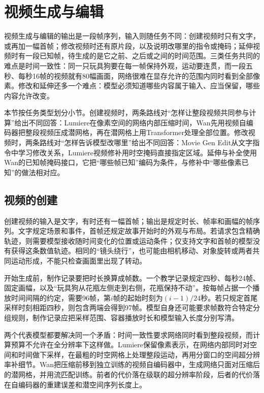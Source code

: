 \section{视频生成与编辑}
\label{sec:vision-multigen-video}

视频生成与编辑的输出是一段帧序列，输入则随任务不同：创建视频时只有文字，或再加一幅首帧；修改视频时还有原片段，以及说明改哪里的指令或掩码；延伸视频时有一段已知帧，待生成的是它之前、之后或之间的时间范围。三类任务共同的难点是时间一致性：同一只玩具狗要在每一帧保持外观，运动要连贯，而一段五秒、每秒16帧的视频就有80幅画面，网络很难在显存允许的范围内同时看到全部像素。修改和延伸还多一个难点：模型必须知道哪些内容属于输入、应当保留，哪些内容允许改变。

本节按任务类型划分小节。创建视频时，两条路线对“怎样让整段视频共同参与计算”给出不同回答：Lumiere在像素空间的网络内部压缩时间，Wan先用视频自编码器把整段视频压成潜网格，再在潜网格上用Transformer处理全部位置。修改视频时，两条路线对“怎样告诉模型改哪里”给出不同回答：Movie Gen Edit从文字指令中学习修改关系，Lumiere视频修补用时空掩码直接指定区域。延伸与补全使用Wan的已知帧掩码接口，它把“哪些帧已知”编码为条件，与修补中“哪些像素已知”的做法相对应。

\subsection{视频的创建}
\label{sec:vision-multigen-create-video}

创建视频的输入是文字，有时还有一幅首帧；输出是规定时长、帧率和画幅的帧序列。文字规定场景和事件，首帧还规定故事开始时的外观与布局。若请求包含精确轨迹，则需要模型接收随时间变化的位置或运动条件；仅支持文字和首帧的模型没有获得这条数值轨迹。相同的“镜头绕行”，也可能由相机移动、对象旋转或两者共同运动形成，不能只检查画面里出现了转动。

开始生成前，制作记录要把时长换算成帧数。一个教学记录规定四秒、每秒24帧、固定画幅，以及“玩具狗从花瓶左侧走到右侧，花瓶保持不动”。按每帧占据一个播放时间间隔的约定，需要96帧，第$i$帧的起始时刻为$(i-1)/24$秒。若只规定首尾采样时刻相距四秒，则包含两端会得到97帧。模型自身还可能要求帧数符合特定分组规则，制作记录应把采样范围、容器播放时长和模型输入长度分别写清。

两个代表模型都要解决同一个矛盾：时间一致性要求网络同时看到整段视频，而计算预算不允许在全分辨率下这样做。Lumiere保留像素表示，在网络内部同时对空间和时间做下采样，在最粗的时空网格上处理整段运动，再用分窗口的空间超分辨率补细节。Wan把压缩前移到独立训练的视频自编码器中，生成网络只面对压缩后的潜网格，并用流匹配训练。前者的代价落在级联的超分辨率阶段，后者的代价落在自编码器的重建误差和潜空间序列长度上。

